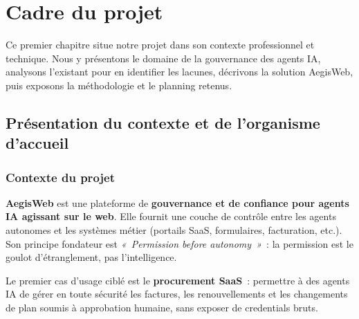 \chapter{Cadre du projet}

\begin{chapintro}
Ce premier chapitre situe notre projet dans son contexte professionnel
et technique. Nous y présentons le domaine de la gouvernance des agents
IA, analysons l'existant pour en identifier les lacunes, décrivons la
solution AegisWeb, puis exposons la méthodologie et le planning retenus.
\end{chapintro}

\section{Présentation du contexte et de l'organisme d'accueil}

\subsection{Contexte du projet}

\textbf{AegisWeb} est une plateforme de \textbf{gouvernance et de confiance
pour agents IA agissant sur le web}. Elle fournit une couche de contrôle
entre les agents autonomes et les systèmes métier (portails SaaS,
formulaires, facturation, etc.). Son principe fondateur est
\textit{«~Permission before autonomy~»}~: la permission est le goulot
d'étranglement, pas l'intelligence.

Le premier cas d'usage ciblé est le \textbf{procurement SaaS}~: permettre
à des agents IA de gérer en toute sécurité les factures, les
renouvellements et les changements de plan soumis à approbation humaine,
sans exposer de credentials bruts.


